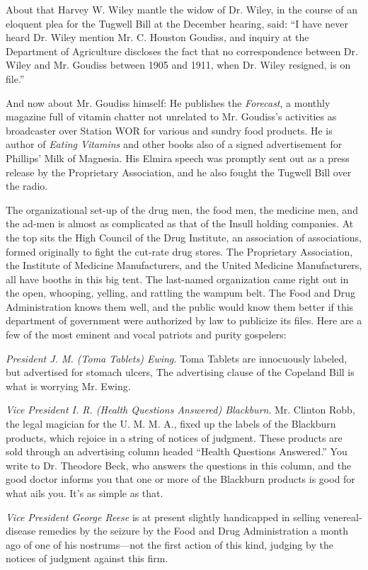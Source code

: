 \documentclass[openany,nobib]{tufte-book}
\begin{document}
About that Harvey W. Wiley mantle the widow of Dr. Wiley, in the course
of an eloquent plea for the Tugwell Bill at the December hearing, said:
``I have never heard Dr. Wiley mention Mr. C. Houston Goudiss, and
inquiry at the Department of Agriculture discloses the fact that no
correspondence between Dr. Wiley and Mr. Goudiss between 1905 and 1911,
when Dr. Wiley resigned, is on file.''

And now about Mr. Goudiss himself: He publishes the \emph{Forecast}, a
monthly magazine full of vitamin chatter not unrelated to Mr. Goudiss's
activities as broadcaster over Station WOR for various and sundry food
products. He is author of \emph{Eating Vitamins} and other books also of
a signed advertisement for Phillips' Milk of Magnesia. His Elmira speech
was promptly sent out as a press release by the Proprietary Association,
and he also fought the Tugwell Bill over the radio.

The organizational set-up of the drug men, the food men, the medicine
men, and the ad-men is almost as complicated as that of the Insull
holding companies. At the top sits the High Council of the Drug
Institute, an association of associations, formed originally to fight
the cut-rate drug stores. The Proprietary Association, the Institute of
Medicine Manufacturers, and the United Medicine Manufacturers, all have
booths in this big tent. The last-named organization came right out in
the open, whooping, yelling, and rattling the wampum belt. The Food and
Drug Administration knows them well, and the public would know them
better if this department of government were authorized by law to
publicize its files. Here are a few of the most eminent and vocal
patriots and purity gospelers:

\emph{President J. M. (Toma Tablets) Ewing}. Toma Tablets are
innocuously labeled, but advertised for stomach ulcers, The advertising
clause of the Copeland Bill is what is worrying Mr. Ewing.

\emph{Vice President I. R. (Health Questions Answered) Blackburn}. Mr.
Clinton Robb, the legal magician for the U. M. M. A., fixed up the
labels of the Blackburn products, which rejoice in a string of notices
of judgment. These products are sold through an advertising column
headed ``Health Questions Answered.'' You write to Dr. Theodore Beck,
who answers the questions in this column, and the good doctor informs
you that one or more of the Blackburn products is good for what ails
you. It's as simple as that.

\emph{Vice President George Reese} is at present slightly handicapped in
selling venereal-disease remedies by the seizure by the Food and Drug
Administration a month ago of one of his nostrums---not the first action
of this kind, judging by the notices of judgment against this firm.
\end{document}
